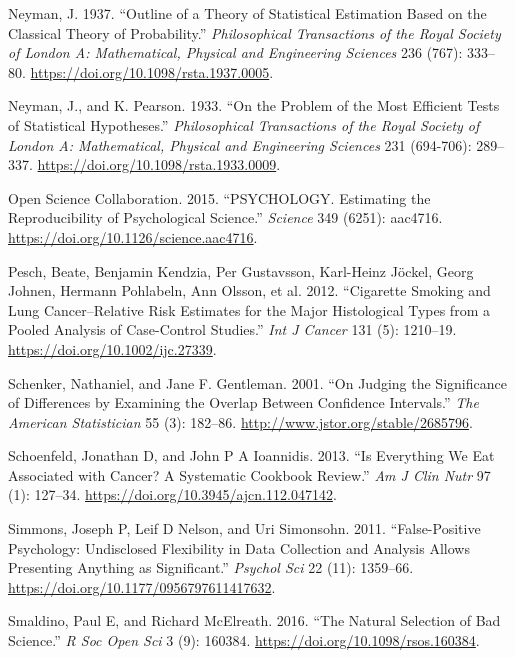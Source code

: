 \documentclass[
  12pt,
]{book}
\newlength{\cslhangindent}
\newlength{\cslentryspacingunit} %
\newenvironment{CSLReferences}[2] %
 {%
  \setlength{\parindent}{0pt}
  \ifodd #1
  \let\oldpar\par
  \def\par{\hangindent=\cslhangindent\oldpar}
  \fi
  \setlength{\parskip}{#2\cslentryspacingunit}
 }%
 {}
\begin{document}
\begin{CSLReferences}{1}{0}
\leavevmode{}%
Neyman, J. 1937. {``Outline of a Theory of Statistical Estimation Based on the Classical Theory of Probability.''} \emph{Philosophical Transactions of the Royal Society of London A: Mathematical, Physical and Engineering Sciences} 236 (767): 333--80. \url{https://doi.org/10.1098/rsta.1937.0005}.

\leavevmode{}%
Neyman, J., and K. Pearson. 1933. {``On the Problem of the Most Efficient Tests of Statistical Hypotheses.''} \emph{Philosophical Transactions of the Royal Society of London A: Mathematical, Physical and Engineering Sciences} 231 (694-706): 289--337. \url{https://doi.org/10.1098/rsta.1933.0009}.

\leavevmode{}%
Open Science Collaboration. 2015. {``PSYCHOLOGY. Estimating the Reproducibility of Psychological Science.''} \emph{Science} 349 (6251): aac4716. \url{https://doi.org/10.1126/science.aac4716}.

\leavevmode{}%
Pesch, Beate, Benjamin Kendzia, Per Gustavsson, Karl-Heinz Jöckel, Georg Johnen, Hermann Pohlabeln, Ann Olsson, et al. 2012. {``Cigarette Smoking and Lung Cancer--Relative Risk Estimates for the Major Histological Types from a Pooled Analysis of Case-Control Studies.''} \emph{Int J Cancer} 131 (5): 1210--19. \url{https://doi.org/10.1002/ijc.27339}.

\leavevmode{}%
Schenker, Nathaniel, and Jane F. Gentleman. 2001. {``On Judging the Significance of Differences by Examining the Overlap Between Confidence Intervals.''} \emph{The American Statistician} 55 (3): 182--86. \url{http://www.jstor.org/stable/2685796}.

\leavevmode{}%
Schoenfeld, Jonathan D, and John P A Ioannidis. 2013. {``Is Everything We Eat Associated with Cancer? A Systematic Cookbook Review.''} \emph{Am J Clin Nutr} 97 (1): 127--34. \url{https://doi.org/10.3945/ajcn.112.047142}.

\leavevmode{}%
Simmons, Joseph P, Leif D Nelson, and Uri Simonsohn. 2011. {``False-Positive Psychology: Undisclosed Flexibility in Data Collection and Analysis Allows Presenting Anything as Significant.''} \emph{Psychol Sci} 22 (11): 1359--66. \url{https://doi.org/10.1177/0956797611417632}.

\leavevmode{}%
Smaldino, Paul E, and Richard McElreath. 2016. {``The Natural Selection of Bad Science.''} \emph{R Soc Open Sci} 3 (9): 160384. \url{https://doi.org/10.1098/rsos.160384}.


\end{CSLReferences}
\end{document}
